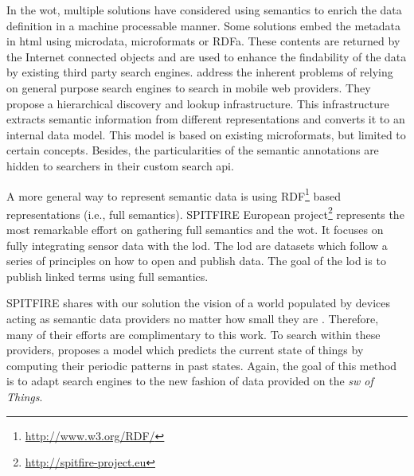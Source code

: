 In the \acl{wot}, multiple solutions have considered using semantics to enrich the data definition in a machine processable manner.
Some solutions embed the metadata in \acs{html} using microdata, microformats or RDFa.
These contents are returned by the Internet connected objects and are used to enhance the findability of the data by existing third party search engines.
\citet{trifa_leveraging_2011} address the inherent problems of relying on general purpose search engines to search in mobile web providers.
They propose a hierarchical discovery and lookup infrastructure.
This infrastructure extracts semantic information from different representations and converts it to an internal data model.
This model is based on existing microformats, but limited to certain concepts.
Besides, the particularities of the semantic annotations are hidden to searchers in their custom search \acs{api}. %


A more general way to represent semantic data is using RDF\footnote{\url{http://www.w3.org/RDF/}} based representations (i.e., full semantics). %
SPITFIRE European project\footnote{\url{http://spitfire-project.eu}} represents the most remarkable effort on gathering full semantics and the \ac{wot}.
It focuses on fully integrating sensor data with the \ac{lod}. 
The \ac{lod} are datasets which follow a series of principles on how to open and publish data.
The goal of the \ac{lod} is to publish linked terms using full semantics.

SPITFIRE shares with our solution the vision of a world populated by devices acting as semantic data providers no matter how small they are \citep{hasemann_rdf_2012}.
Therefore, many of their efforts are complimentary to this work.
To search within these providers, \citet{pfisterer_spitfire:_2011} proposes a model which predicts the current state of things by computing their periodic patterns in past states.
Again, the goal of this method is to adapt search engines to the new fashion of data provided on the \emph{\acl{sw} of Things}.


